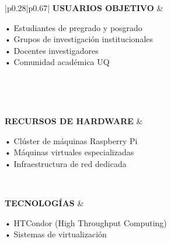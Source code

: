 \begin{table}[H]
\begin{tabular}{|p{0.28\textwidth}|p{0.67\textwidth}|}
		\textbf{USUARIOS OBJETIVO}         &
		\begin{minipage}[t]{\linewidth}
			\vspace{2pt}
			• Estudiantes de pregrado y posgrado \\
			• Grupos de investigación institucionales \\
			• Docentes investigadores \\
			• Comunidad académica UQ
			\vspace{2pt}
		\end{minipage}                                                                                                                                                                                                                                     \\ \hline

		                                                                                                                                                                                                    \\ \hline

		\textbf{RECURSOS DE HARDWARE}      &
		\begin{minipage}[t]{\linewidth}
			\vspace{2pt}
			• Clúster de máquinas Raspberry Pi \\
			• Máquinas virtuales especializadas \\
			• Infraestructura de red dedicada
			\vspace{2pt}
		\end{minipage}                                                                                                                                                                                                                                           \\ \hline

		\textbf{TECNOLOGÍAS}               &
		\begin{minipage}[t]{\linewidth}
			\vspace{2pt}
			• HTCondor (High Throughput Computing) \\
			• Sistemas de virtualización \\
			\vspace{2pt}
		\end{minipage}                                                                                                                                                                                                                                        \\ \hline


\end{tabular}
\end{table}
